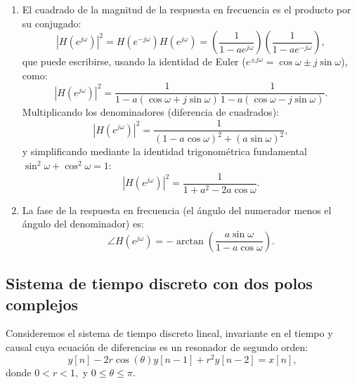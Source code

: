 \documentclass[11pt,a4paper,openany]{book}
\begin{document}
\begin{enumerate}
	\item El cuadrado de la magnitud de la respuesta en frecuencia es el producto por su conjugado:
	\begin{equation}
		|H(e^{j\omega})|^2 = H(e^{-j\omega}) H(e^{j\omega}) = \left(\frac{1}{1 - a e^{j\omega}}\right) \left(\frac{1}{1 - a e^{-j\omega}}\right),
	\end{equation}
	que puede escribirse, usando la identidad de Euler ($e^{\pm j\omega} = \cos\omega \pm j\sin\omega$), como:
	\begin{equation}
		|H(e^{j\omega})|^2 = \frac{1}{1 - a(\cos\omega + j\sin\omega)} \frac{1}{1 - a(\cos\omega - j\sin\omega)}.
	\end{equation}
	Multiplicando los denominadores (diferencia de cuadrados):
	\begin{equation}
		|H(e^{j\omega})|^2 = \frac{1}{(1 - a\cos\omega)^{2} + (a\sin\omega)^{2}},
	\end{equation}
	y simplificando mediante la identidad trigonométrica fundamental $\sin^2\omega + \cos^2\omega = 1$:
	\begin{equation}
		|H(e^{j\omega})|^2 = \frac{1}{1 + a^{2} - 2a\cos\omega}.
	\end{equation}
	
	\item La fase de la respuesta en frecuencia (el ángulo del numerador menos el ángulo del denominador) es:
	\begin{equation}
		\angle H(e^{j\omega}) = -\arctan \left( \frac{a\sin\omega}{1 - a\cos\omega} \right).
	\end{equation}
\end{enumerate}

\subsection{Sistema de tiempo discreto con dos polos complejos}

Consideremos el sistema de tiempo discreto lineal, invariante en el tiempo y causal cuya ecuaci\'{o}n de diferencias es un resonador de segundo orden:
\begin{equation}
	y[n] - 2r\cos(\theta) y[n-1] + r^{2} y[n-2] = x[n],
\end{equation}
donde $0 < r < 1,$ y $0 \leq \theta \leq \pi.$
\end{document}
